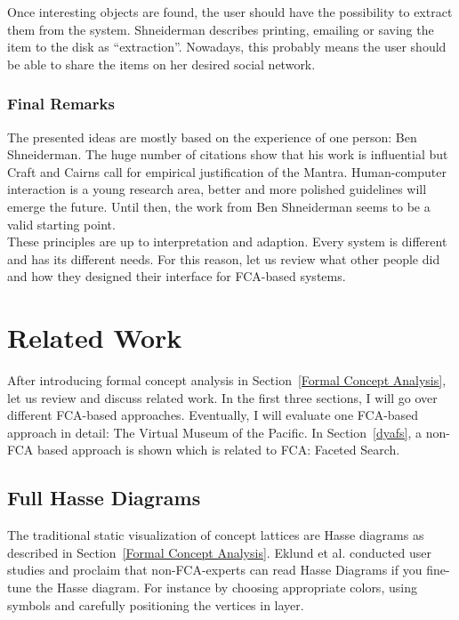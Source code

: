 \documentclass[11pt]{report}
\begin{document}
Once interesting objects are found, the user should have the possibility to extract them from the system. Shneiderman describes printing, emailing or saving the item to the disk as ``extraction''. Nowadays, this probably means the user should be able to share the items on her desired social network.

\subsection{Final Remarks}

The presented ideas are mostly based on the experience of one person: Ben Shneiderman. The huge number of citations show that his work is influential but Craft and Cairns \cite{Craft2005} call for empirical justification of the Mantra. Human-computer interaction is a young research area, better and more polished guidelines will emerge the future. Until then, the work from Ben Shneiderman seems to be a valid starting point. \\

These principles are up to interpretation and adaption. Every system is different and has its different needs. For this reason, let us review what other people did and how they designed their interface for FCA-based systems.

\chapter{Related Work}
\label{Related Work}

After introducing formal concept analysis in Section~\ref{Formal Concept Analysis}, let us review and discuss related work. In the first three sections, I will go over different FCA-based approaches. Eventually, I will evaluate one FCA-based approach in detail: The Virtual Museum of the Pacific. In Section~\ref{dyafs}, a non-FCA based approach is shown which is related to FCA: Faceted Search. \\

\section{Full Hasse Diagrams}

The traditional static visualization of concept lattices are Hasse diagrams as described in Section~\ref{Formal Concept Analysis}. Eklund et al. \cite{Eklund2004} conducted user studies and proclaim that non-FCA-experts can read Hasse Diagrams if you fine-tune the Hasse diagram. For instance by choosing appropriate colors, using symbols and carefully positioning the vertices in layer. \\
\end{document}
